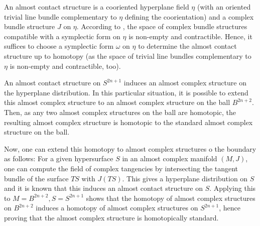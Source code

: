 \begin{definition}
    An almost contact structure is a cooriented hyperplane field $\eta$ (with an oriented trivial line bundle complementary to $\eta$ defining the coorientation) 
    and a complex bundle structure $J$ on $\eta$.
    According to \cite[Prop 2.4.5]{Geiges08}, the space of complex bundle structures compatible with a symplectic form on $\eta$ is non-empty and contractible. 
    Hence, it suffices to choose a symplectic form $\omega$ on $\eta$ to determine the almost contact structure up to homotopy 
    (as the space of trivial line bundles complementary to $\eta$ is non-empty and contractible, too).
\end{definition}

An almost contact structure on $S^{2n+1}$ induces an almost complex structure on the hyperplane distribution.
In this particular situation, it is possible to extend this almost complex structure to an almost complex structure on the ball $B^{2n+2}$.
Then, as any two almost complex structures on the ball are homotopic, the resulting almost complex structure is homotopic to the
standard almost complex structure on the ball.

Now, one can extend this homotopy to almost complex structures o the boundary as follows: 
For a given hypersurface $S$ in an almost complex manifold $(M, J)$, one can compute the field of complex tangencies by intersecting
the tangent bundle of the surface $TS$ with $J(TS)$. 
This gives a hyperplane distribution on $S$ and it is known that this induces an almost contact structure on $S$.
Applying this to $M = B^{2n+2}, S = S^{2n+1}$ shows that the homotopy of almost complex structures on $B^{2n+2}$ 
induces a homotopy of almost complex structures on $S^{2n+1}$, hence proving that the almost complex structure is homotopically standard.